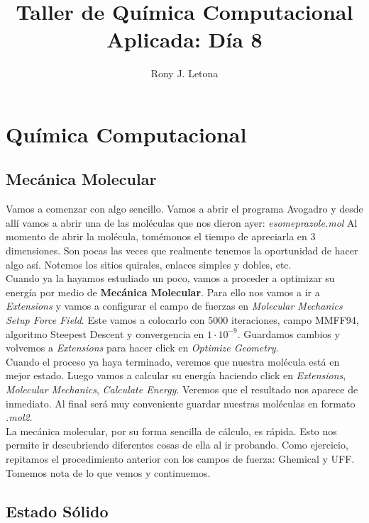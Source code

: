 \documentclass[10pt,letterpaper]{article}
\author{Rony J. Letona}
\title{Taller de Qu\'imica Computacional Aplicada: D\'ia 8}
\begin{document}
\maketitle

\section{Qu\'imica Computacional}

\subsection{Mec\'anica Molecular}
Vamos a comenzar con algo sencillo. Vamos a abrir el programa Avogadro y desde all\'i vamos a abrir una de las mol\'eculas que nos dieron ayer: \textit{esomeprazole.mol} Al momento de abrir la mol\'ecula, tom\'emonos el tiempo de apreciarla en 3 dimensiones. Son pocas las veces que realmente tenemos la oportunidad de hacer algo as\'i. Notemos los sitios quirales, enlaces simples y dobles, etc.\\

Cuando ya la hayamos estudiado un poco, vamos a proceder a optimizar su energ\'ia por medio de \textbf{Mec\'anica Molecular}.  Para ello nos vamos a ir a \emph{Extensions} y vamos a configurar el campo de fuerzas en \emph{Molecular Mechanics} \emph{Setup Force Field}. Este vamos a colocarlo con 5000 iteraciones, campo MMFF94, algoritmo Steepest Descent y convergencia en $1 \cdot 10^{-9}$. Guardamos cambios y volvemos a \emph{Extensions} para hacer click en \emph{Optimize Geometry}.\\

Cuando el proceso ya haya terminado, veremos que nuestra mol\'ecula est\'a en mejor estado. Luego vamos a calcular su energ\'ia haciendo click en \emph{Extensions}, \emph{Molecular Mechanics}, \emph{Calculate Energy}. Veremos que el resultado nos aparece de inmediato. Al final ser\'a muy conveniente guardar nuestras mol\'eculas en formato \emph{.mol2}.\\

La mec\'anica molecular, por su forma sencilla de c\'alculo, es r\'apida. Esto nos permite ir descubriendo diferentes cosas de ella al ir probando. Como ejercicio, repitamos el procedimiento anterior con los campos de fuerza: Ghemical y UFF. Tomemos nota de lo que vemos y continuemos.

\subsection{Estado S\'olido}
\end{document}
